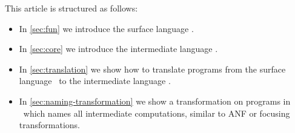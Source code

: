 This article is structured as follows:
\begin{itemize}
    \item In \cref{sec:fun} we introduce the surface language \surfacelang.
    \item In \cref{sec:core} we introduce the intermediate language \targetlang.
    \item In \cref{sec:translation} we show how to translate programs from the surface language \surfacelang\ to the intermediate language \targetlang.
    \item In \cref{sec:naming-transformation} we show a transformation on programs in \targetlang\ which names all intermediate computations, similar to ANF or focusing transformations.
\end{itemize}
